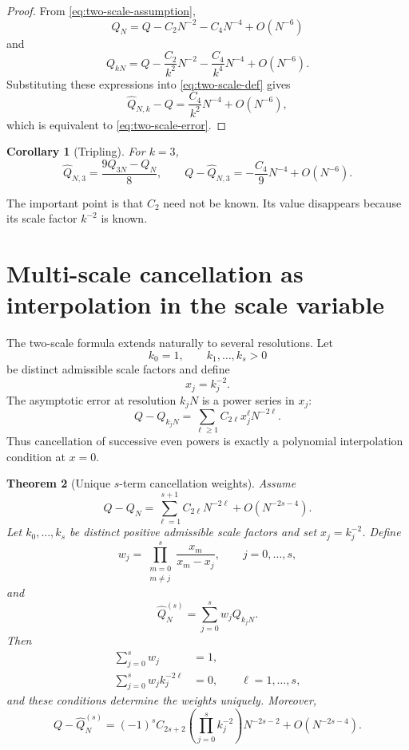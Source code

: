 \documentclass[11pt]{article}
\newtheorem{theorem}{Theorem}[section]
\newtheorem{corollary}[theorem]{Corollary}
\theoremstyle{remark}
\newcommand{\wideQ}{\widehat{Q}}
\begin{document}
\begin{proof}
From \eqref{eq:two-scale-assumption},
\[
Q_N
=
Q-C_2N^{-2}-C_4N^{-4}+O(N^{-6})
\]
and
\[
Q_{kN}
=
Q-\frac{C_2}{k^2}N^{-2}
-\frac{C_4}{k^4}N^{-4}+O(N^{-6}).
\]
Substituting these expressions into \eqref{eq:two-scale-def} gives
\[
\wideQ_{N,k}-Q
=
\frac{C_4}{k^2}N^{-4}+O(N^{-6}),
\]
which is equivalent to \eqref{eq:two-scale-error}.
\end{proof}

\begin{corollary}[Tripling]
\label{cor:tripling}
For $k=3$,
\begin{equation}
\label{eq:tripling}
\wideQ_{N,3}
=
\frac{9Q_{3N}-Q_N}{8},
\qquad
Q-\wideQ_{N,3}
=
-\frac{C_4}{9}N^{-4}+O(N^{-6}).
\end{equation}
\end{corollary}

The important point is that $C_2$ need not be known.  Its value disappears
because its scale factor $k^{-2}$ is known.

\section{Multi-scale cancellation as interpolation in the scale variable}

The two-scale formula extends naturally to several resolutions.  Let
\[
k_0=1,\qquad k_1,\ldots,k_s>0
\]
be distinct admissible scale factors and define
\[
x_j=k_j^{-2}.
\]
The asymptotic error at resolution $k_jN$ is a power series in $x_j$:
\[
Q-Q_{k_jN}
=
\sum_{\ell\ge1}C_{2\ell}x_j^{\ell}N^{-2\ell}.
\]
Thus cancellation of successive even powers is exactly a polynomial
interpolation condition at $x=0$.

\begin{theorem}[Unique $s$-term cancellation weights]
\label{thm:multiscale}
Assume
\begin{equation}
\label{eq:multi-expansion}
Q-Q_N
=
\sum_{\ell=1}^{s+1}C_{2\ell}N^{-2\ell}
+O(N^{-2s-4}).
\end{equation}
Let $k_0,\ldots,k_s$ be distinct positive admissible scale factors and set
$x_j=k_j^{-2}$.  Define
\begin{equation}
\label{eq:weights}
w_j
=
\prod_{\substack{m=0\\m\ne j}}^{s}
\frac{x_m}{x_m-x_j},
\qquad j=0,\ldots,s,
\end{equation}
and
\begin{equation}
\label{eq:multi-estimator}
\wideQ_N^{(s)}
=
\sum_{j=0}^{s}w_jQ_{k_jN}.
\end{equation}
Then
\begin{align}
\sum_{j=0}^{s}w_j&=1,\label{eq:mom0}\\
\sum_{j=0}^{s}w_jk_j^{-2\ell}&=0,
\qquad \ell=1,\ldots,s,\label{eq:moments}
\end{align}
and these conditions determine the weights uniquely.  Moreover,
\begin{equation}
\label{eq:leading-multiscale}
Q-\wideQ_N^{(s)}
=
(-1)^s C_{2s+2}
\left(\prod_{j=0}^{s}k_j^{-2}\right)
N^{-2s-2}
+O(N^{-2s-4}).
\end{equation}
\end{theorem}
\end{document}
